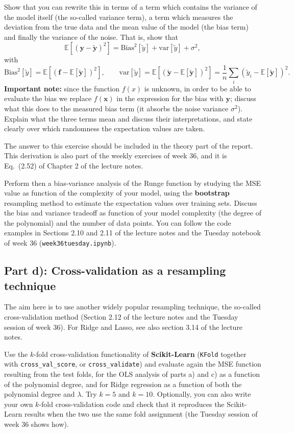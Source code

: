 \documentclass[11pt,a4paper]{article}
\begin{document}
Show that you can rewrite this in terms of a term which contains the variance
of the model itself (the so-called variance term), a term which measures the
deviation from the true data and the mean value of the model (the bias term)
and finally the variance of the noise.  That is, show that
\[
  \mathbb{E}\left[(\bm{y}-\tilde{\bm{y}})^2\right]
   = \mathrm{Bias}^2[\tilde{y}] + \mathrm{var}[\tilde{y}] + \sigma^2,
\]
with
\[
  \mathrm{Bias}^2[\tilde{y}]
   = \mathbb{E}\left[\left(\bm{f}-\mathbb{E}[\tilde{\bm{y}}]\right)^2\right],
  \qquad
  \mathrm{var}[\tilde{y}]
   = \mathbb{E}\left[\left(\tilde{\bm{y}}-\mathbb{E}[\tilde{\bm{y}}]\right)^2\right]
   = \frac{1}{n}\sum_i\left(\tilde{y}_i-\mathbb{E}[\tilde{\bm{y}}]\right)^2 .
\]
\textbf{Important note:} since the function $f(x)$ is unknown, in order to be
able to evaluate the bias we replace $f(\bm{x})$ in the expression for the
bias with $\bm{y}$; discuss what this does to the measured bias term (it
absorbs the noise variance $\sigma^2$).  Explain what the three terms mean
and discuss their interpretations, and state clearly over which randomness
the expectation values are taken.

The answer to this exercise should be included in the theory part of the
report.  This derivation is also part of the weekly exercises of week 36, and it is Eq.~(2.52) of Chapter 2 of the lecture notes.

Perform then a bias-variance analysis of the Runge function by studying the
MSE value as function of the complexity of your model, using the
\textbf{bootstrap} resampling method to estimate the expectation values over
training sets.  Discuss the bias and variance tradeoff as function of your
model complexity (the degree of the polynomial) and the number of data points.
You can follow the code examples in Sections 2.10 and 2.11 of the
lecture notes and the Tuesday notebook of week 36 (\texttt{week36tuesday.ipynb}).

\subsection*{Part d): Cross-validation as a resampling technique}

The aim here is to use another widely popular resampling technique,
the so-called cross-validation method (Section 2.12 of the lecture notes and
the Tuesday session of week 36). For Ridge and Lasso, see also section 3.14 of the lecture notes.

Use the $k$-fold cross-validation functionality of \textbf{Scikit-Learn}
(\texttt{KFold} together with \texttt{cross\_val\_score}, or
\texttt{cross\_validate}) and evaluate again the MSE function resulting from
the test folds, for the OLS analysis of parts a) and c) as a function of the
polynomial degree, and for Ridge regression as a function of both the
polynomial degree and $\lambda$.  Try $k=5$ and $k=10$.  Optionally, you can
also write your own $k$-fold cross-validation code and check that it
reproduces the Scikit-Learn results when the two use the same fold
assignment (the Tuesday session of week 36 shows how).
\end{document}
